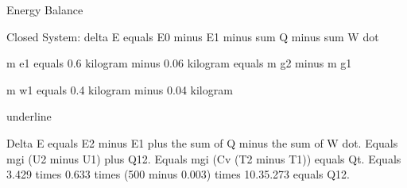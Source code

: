 Energy Balance

Closed System: delta E equals E0 minus E1 minus sum Q minus sum W dot

m e1 equals 0.6 kilogram minus 0.06 kilogram equals m g2 minus m g1

m w1 equals 0.4 kilogram minus 0.04 kilogram

underline

Delta E equals E2 minus E1 plus the sum of Q minus the sum of W dot.  
Equals mgi (U2 minus U1) plus Q12.  
Equals mgi (Cv (T2 minus T1)) equals Qt.  
Equals 3.429 times 0.633 times (500 minus 0.003) times 10.35.273 equals Q12.